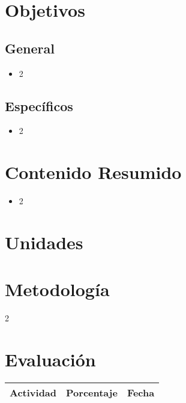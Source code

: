 \documentclass[11pt]{article}
\begin{document}
\section*{Objetivos}

\subsection*{General}

\begin{itemize}
\item 2 
\end{itemize}

\subsection*{Específicos}

\begin{itemize}
\item 2 
\end{itemize}

\section*{Contenido Resumido}

\begin{itemize}
\item 2 
\end{itemize}

\section*{Unidades}
\noindent 


\section*{Metodología}

2

\section*{Evaluación}
\noindent \begin{tabular}{R{0.5\textwidth} C{0.2\textwidth} C{0.2\textwidth}}
	\toprule
	\textbf{Actividad} & \textbf{Porcentaje} & \textbf{Fecha} \\
	\midrule
	
	\midrule
\end{tabular}
\\
\end{document}
